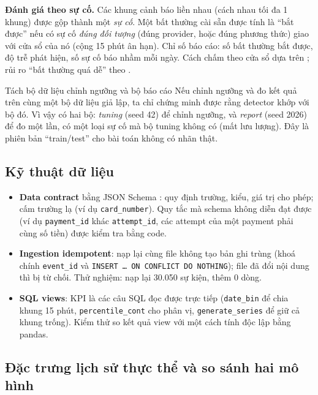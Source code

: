 \documentclass[11pt,a4paper]{article}
\newcommand{\code}[1]{\texttt{\small #1}}
\begin{document}
\textbf{Đánh giá theo sự cố.} Các khung cảnh báo liền nhau (cách nhau tối đa 1 khung) được gộp thành một \emph{sự cố}. Một bất thường cài sẵn được tính là ``bắt được'' nếu có sự cố \emph{đúng đối tượng} (đúng provider, hoặc đúng phương thức) giao với cửa sổ của nó (cộng 15 phút ân hạn). Chỉ số báo cáo: số bất thường bắt được, độ trễ phát hiện, số sự cố báo nhầm mỗi ngày. Cách chấm theo cửa sổ dựa trên \cite{lavin}; rủi ro ``bất thường quá dễ'' theo \cite{wu}.

\begin{explain}{Tách bộ dữ liệu chỉnh ngưỡng và bộ báo cáo}
Nếu chỉnh ngưỡng và đo kết quả trên cùng một bộ dữ liệu giả lập, ta chỉ chứng minh được rằng detector khớp với bộ đó. Vì vậy có hai bộ: \emph{tuning} (seed 42) để chỉnh ngưỡng, và \emph{report} (seed 2026) để đo một lần, có một loại sự cố mà bộ tuning không có (mất lưu lượng). Đây là phiên bản ``train/test'' cho bài toán không có nhãn thật.
\end{explain}

\subsection{Kỹ thuật dữ liệu}
\begin{itemize}
  \item \textbf{Data contract} bằng JSON Schema \cite{jsonschema}: quy định trường, kiểu, giá trị cho phép; cấm trường lạ (ví dụ \code{card\_number}). Quy tắc mà schema không diễn đạt được (ví dụ \code{payment\_id} khác \code{attempt\_id}, các attempt của một payment phải cùng số tiền) được kiểm tra bằng code.
  \item \textbf{Ingestion idempotent}: nạp lại cùng file không tạo bản ghi trùng (khoá chính \code{event\_id} và \code{INSERT … ON CONFLICT DO NOTHING}); file đã đổi nội dung thì bị từ chối. Thử nghiệm: nạp lại 30.050 sự kiện, thêm 0 dòng.
  \item \textbf{SQL views}: KPI là các câu SQL đọc được trực tiếp (\code{date\_bin} để chia khung 15 phút, \code{percentile\_cont} cho phân vị, \code{generate\_series} để giữ cả khung trống). Kiểm thử so kết quả view với một cách tính độc lập bằng pandas.
\end{itemize}

\subsection{Đặc trưng lịch sử thực thể và so sánh hai mô hình}
\end{document}
